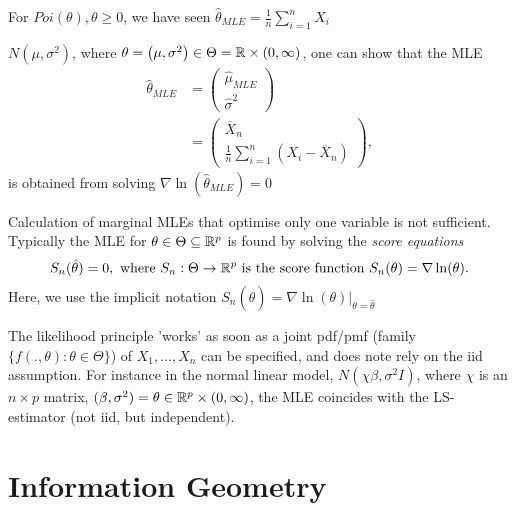 \documentclass[a4paper]{article}
\begin{document}
\begin{eg}
	For $Poi(\theta), \theta \ge 0$, we have seen $\hat{\theta}_{MLE} = \frac{1}{n} \sum_{i=1}^{n} X_{i}$
\end{eg}

\begin{eg}
	$N\left( \mu, \sigma^2 \right) $, where $\theta = \left( \mu, \sigma^2 \right) \in \Theta = \mathbb{R} \times (0, \infty)$, one can show that the MLE
	\begin{align*}
		\hat{\theta}_{MLE} &= \begin{pmatrix} \hat{\mu}_{MLE} \\ \hat{\sigma}^2\end{pmatrix} \\
		&= \begin{pmatrix} \overline{X}_{n} \\ \frac{1}{n} \sum_{i=1}^{n}\left( X_{i} - \overline{X}_{n} \right)  \end{pmatrix} 
	,\end{align*}
	is obtained from solving  $\nabla \ln(\hat{\theta}_{MLE}) = 0$
\end{eg}

\begin{remark}
	Calculation of marginal MLEs that optimise only one variable is not sufficient. Typically the MLE for $\theta \in \Theta \subseteq \mathbb{R}^{p}$ is found by solving the \textit{score equations}
	\[
		S_{n}( \hat{\theta}) = 0, \text{ where } S_{n} : \Theta \to  \mathbb{R}^{p} \text{ is the score function } S_{n} (\theta) = \nabla \ln(\theta)
	.\]
	Here, we use the implicit notation $S_{n}(\hat{\theta}) = \nabla \ln(\theta) |_{\theta = \hat{\theta}}$
\end{remark}

\begin{remark}
	The likelihood principle 'works' as soon as a joint pdf/pmf (family $\{f\left( ., \theta \right) : \theta \in  \Theta\} $) of $X_{1}, \ldots, X_{n}$ can be specified, and does note rely on the iid assumption. For instance in the normal linear model, $N\left( \chi \beta, \sigma^2 I \right) $, where $\chi$ is an $n\times p$ matrix, $(\beta, \sigma^2) = \theta \in \mathbb{R}^{p} \times (0, \infty)$, the MLE coincides with the LS-estimator (not iid, but independent).
\end{remark}

\section{Information Geometry}
\end{document}
